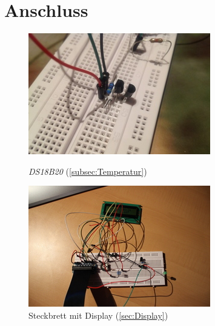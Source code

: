 \section{Anschluss}
\label{sec:Anschluss}
\begin{figure}[h]
	\begin{minipage}[b]{0.45\textwidth}
		\centering
		\includegraphics[width=\textwidth]{figures/anschluss/1_1.jpg}
		\caption{\emph{DS18B20} (\ref{subsec:Temperatur})}
	\end{minipage}\hfill
	\begin{minipage}[b]{0.45\textwidth}
		\centering
		\includegraphics[width=\textwidth]{figures/anschluss/1_2.jpg}
		\caption{\gls{Steckbrett} mit Display (\ref{sec:Display})}
	\end{minipage}\hfill
	\begin{minipage}[b]{0.45\textwidth}
		\centering

\end{minipage}
\end{figure}

